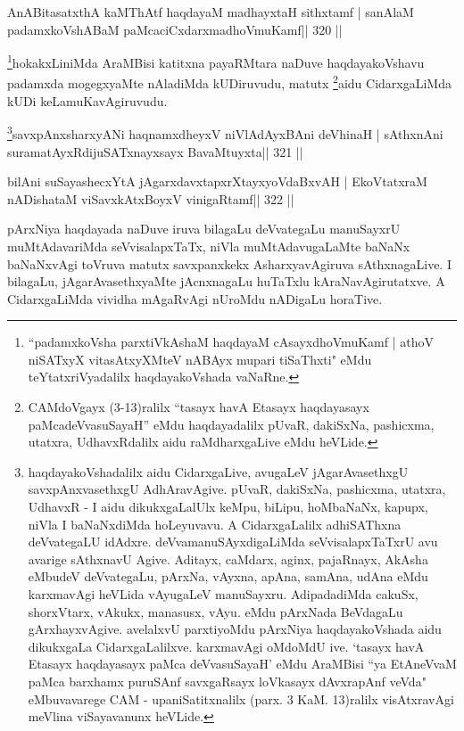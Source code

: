 \begin{shl}
AnABitasatxthA kaMThAtf haqdayaM madhayxtaH sithxtamf |
sanAlaM padamxkoVshABaM paMcaciCxdarxmadhoVmuKamf\hfill || 320 ||
\end{shl}

\begin{artha}
\footnote{``padamxkoVsha parxtiVkAshaM haqdayaM cAsayxdhoVmuKamf |  athoV niSATxyX vitasAtxyXMteV nABAyx mupari tiSaThxti" eMdu  teYtatxriVyadalilx haqdayakoVshada vaNaRne.}hokakxLiniMda 
AraMBisi katitxna payaRMtara naDuve haqdayakoVshavu padamxda 
mogegxyaMte nAladiMda kUDiruvudu, matutx \footnote{CAMdoVgayx  (3-13)ralilx ``tasayx havA Etasayx haqdayasayx paMcadeVvasuSayaH'' eMdu  haqdayadalilx pUvaR, dakiSxNa, pashicxma, utatxra, UdhavxRdalilx aidu  raMdharxgaLive eMdu heVLide.}aidu CidarxgaLiMda kUDi keLamuKavAgiruvudu.
\end{artha}

\begin{shl}
\footnote{haqdayakoVshadalilx aidu CidarxgaLive, avugaLeV  jAgarAvasethxgU savxpAnxvasethxgU AdhAravAgive. pUvaR, dakiSxNa,  pashicxma, utatxra, UdhavxR - I aidu dikukxgaLalUlx keMpu, biLipu,  hoMbaNaNx, kapupx, niVla I baNaNxdiMda hoLeyuvavu. A CidarxgaLalilx  adhiSAThxna deVvategaLU idAdxre. deVvamanuSAyxdigaLiMda  seVvisalapxTaTxrU avu avarige sAthxnavU Agive. Aditayx, caMdarx, aginx,  pajaRnayx, AkAsha eMbudeV deVvategaLu, pArxNa, vAyxna, apAna, samAna,  udAna eMdu karxmavAgi heVLida vAyugaLeV manuSayxru. AdipadadiMda  cakuSx, shorxVtarx, vAkukx, manasusx, vAyu. eMdu pArxNada BeVdagaLu  gArxhayxvAgive. avelalxvU parxtiyoMdu pArxNiya haqdayakoVshada aidu  dikukxgaLa CidarxgaLalilxve. karxmavAgi oMdoMdU ive. `tasayx havA  Etasayx haqdayasayx paMca deVvasuSayaH' eMdu AraMBisi ``ya EtAneVvaM  paMca barxhamx puruSAnf savxgaRsayx loVkasayx dAvxrapAnf veVda"  eMbuvavarege CAM - upaniSatitxnalilx (parx. 3 KaM. 13)ralilx visAtxravAgi meVlina viSayavanunx heVLide.}savxpAnxsharxyANi haqnamxdheyxV niVlAdAyxBAni deVhinaH |
sAthxnAni suramatAyxRdijuSATxnayxsayx BavaMtuyxta\hfill || 321 ||
\end{shl}

\begin{shl}
bilAni suSayashecxYtA jAgarxdavxtapxrXtayxyoVdaBxvAH |
EkoVtatxraM nADishataM viSavxkAtxBoyxV vinigaRtamf\hfill || 322 ||
\end{shl}

\begin{artha}
pArxNiya haqdayada naDuve iruva bilagaLu deVvategaLu manuSayxrU  muMtAdavariMda seVvisalapxTaTx, niVla muMtAdavugaLaMte baNaNx  baNaNxvAgi toVruva matutx savxpanxkekx AsharxyavAgiruva sAthxnagaLive.  I bilagaLu, jAgarAvasethxyaMte jAcnxnagaLu huTaTxlu kAraNavAgirutatxve. A CidarxgaLiMda vividha mAgaRvAgi nUroMdu nADigaLu horaTive.
\end{artha}

